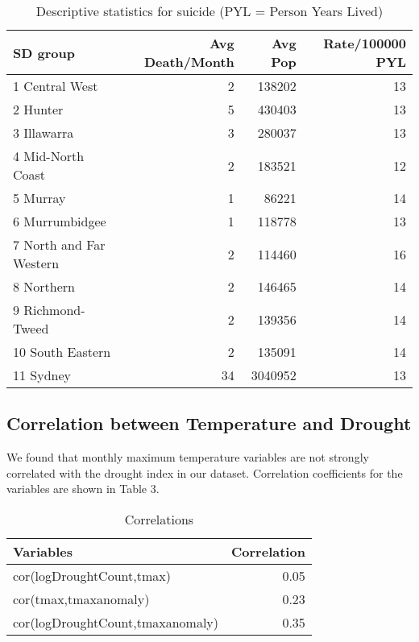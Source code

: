 \documentclass[a4paper]{article}                %
\begin{document}

        \begin{table}[!ht]
        \begin{center}
        \caption{Descriptive statistics for suicide (PYL = Person Years Lived)}
        \label{tab:tab2}
        \begin{tabular}{lrrr}
        \hline
        SD group & Avg Death/Month & Avg Pop & Rate/100000 PYL \\
        \hline
        1 Central West & 2 & 138202 & 13 \\
        2 Hunter & 5 & 430403 & 13 \\
        3 Illawarra & 3 & 280037 & 13 \\
        4 Mid-North Coast & 2 & 183521 & 12 \\
        5 Murray & 1 & 86221 & 14 \\
        6 Murrumbidgee & 1 & 118778 & 13 \\
        7 North and Far Western & 2 & 114460 & 16 \\
        8 Northern & 2 & 146465 & 14 \\
        9 Richmond-Tweed & 2 & 139356 & 14 \\
        10 South Eastern & 2 & 135091 & 14 \\
        11 Sydney & 34 & 3040952 & 13 \\
        \hline
        \end{tabular}
        \end{center}
        \end{table}

\clearpage

\subsection{Correlation between Temperature and Drought}

 We found that monthly maximum temperature variables are not strongly correlated with the drought index in our dataset.  Correlation coefficients for the variables are shown in Table 3.



\begin{table}[ht]
\centering
\caption{Correlations} 
\label{tab:Correlations}
\begin{tabular}{lr}
  \hline
Variables & Correlation \\ 
  \hline
cor(logDroughtCount,tmax) & 0.05 \\ 
  cor(tmax,tmaxanomaly) & 0.23 \\ 
  cor(logDroughtCount,tmaxanomaly) & 0.35 \\ 
   \hline
\end{tabular}
\end{table}
\end{document}
